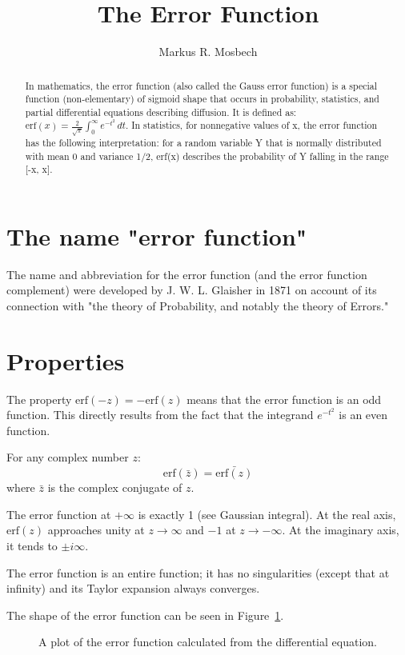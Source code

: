 \documentclass[a4paper]{article}
\title{The Error Function}
\author{Markus R. Mosbech}
\date{}
\begin{document}
\maketitle

\begin{abstract}
In mathematics, the error function (also called the Gauss error function) is a
special function (non-elementary) of sigmoid shape that occurs in probability,
statistics, and partial differential equations describing diffusion.
It is defined as:
$\mathrm{erf}(x) = \frac{2}{\sqrt{\pi}}\int_0^\infty e^{-t^2} \, dt$.
In statistics, for nonnegative values of x, the error function has the following
interpretation: for a random variable Y that is normally distributed with mean 0
and variance 1/2, erf(x) describes the probability of Y falling in the range
[-x, x].
\end{abstract}

\section{The name "error function"}
The name and abbreviation for the error function (and the error function
complement) were developed by J. W. L. Glaisher in 1871 on account of its
connection with "the theory of Probability, and notably the theory of Errors."

\section{Properties}
The property $\mathrm{erf} ⁡ ( - z ) = − \mathrm{erf} ⁡ ( z )$  means that the
error function is an odd function. This directly results from the fact that the
integrand $e^{ - t^2}$ is an even function.

For any complex number $z$:
\begin{equation}
  \mathrm{erf}(\bar{z})=\bar{\mathrm{erf}(z)}
\end{equation}
where $\bar{z}$ is the complex conjugate of $z$.

The error function at $+\infty$ is exactly 1 (see Gaussian integral). At the
real axis, $\mathrm{erf}(z)$ approaches unity at $ z \rightarrow \infty$ and
$-1$ at $z \rightarrow -\infty$. At the imaginary axis, it tends to $\pm i\infty$.

The error function is an entire function; it has no singularities (except that at
infinity) and its Taylor expansion always converges.

The shape of the error function can be seen in Figure~\ref{fig:erf}.
\begin{figure}
  
  \caption{A plot of the error function calculated from the differential equation.}
  \label{fig:erf}
\end{figure}
\end{document}

